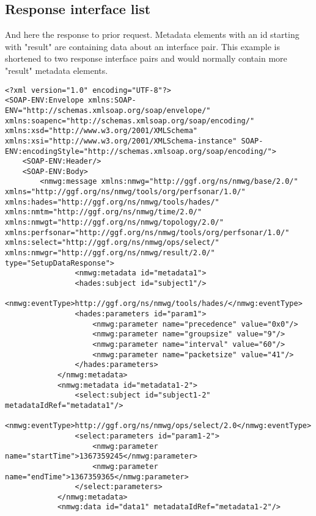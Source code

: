 \documentclass[a4paper,12pt,titlepage,hidelinks,fleqn]{article}
\begin{document}
\subsection{Response interface list}
\begin{flushleft}
And here the response to prior request. 
Metadata elements with an id starting with "result" are containing data about an interface pair. This example is shortened to two response interface pairs and would normally contain more "result" metadata elements.
\begin{framed}
\begin{lstlisting}
<?xml version="1.0" encoding="UTF-8"?>
<SOAP-ENV:Envelope xmlns:SOAP-ENV="http://schemas.xmlsoap.org/soap/envelope/" xmlns:soapenc="http://schemas.xmlsoap.org/soap/encoding/" xmlns:xsd="http://www.w3.org/2001/XMLSchema" xmlns:xsi="http://www.w3.org/2001/XMLSchema-instance" SOAP-ENV:encodingStyle="http://schemas.xmlsoap.org/soap/encoding/">
	<SOAP-ENV:Header/>
	<SOAP-ENV:Body>
		<nmwg:message xmlns:nmwg="http://ggf.org/ns/nmwg/base/2.0/" xmlns="http://ggf.org/ns/nmwg/tools/org/perfsonar/1.0/" xmlns:hades="http://ggf.org/ns/nmwg/tools/hades/" xmlns:nmtm="http://ggf.org/ns/nmwg/time/2.0/" xmlns:nmwgt="http://ggf.org/ns/nmwg/topology/2.0/" xmlns:perfsonar="http://ggf.org/ns/nmwg/tools/org/perfsonar/1.0/" xmlns:select="http://ggf.org/ns/nmwg/ops/select/" xmlns:nmwgr="http://ggf.org/ns/nmwg/result/2.0/" type="SetupDataResponse">
				<nmwg:metadata id="metadata1">
				<hades:subject id="subject1"/>
				<nmwg:eventType>http://ggf.org/ns/nmwg/tools/hades/</nmwg:eventType>
				<hades:parameters id="param1">
					<nmwg:parameter name="precedence" value="0x0"/>
					<nmwg:parameter name="groupsize" value="9"/>
					<nmwg:parameter name="interval" value="60"/>
					<nmwg:parameter name="packetsize" value="41"/>
				</hades:parameters>
			</nmwg:metadata>
			<nmwg:metadata id="metadata1-2">
				<select:subject id="subject1-2" metadataIdRef="metadata1"/>
				<nmwg:eventType>http://ggf.org/ns/nmwg/ops/select/2.0</nmwg:eventType>
				<select:parameters id="param1-2">
					<nmwg:parameter name="startTime">1367359245</nmwg:parameter>
					<nmwg:parameter name="endTime">1367359365</nmwg:parameter>
				</select:parameters>
			</nmwg:metadata>
			<nmwg:data id="data1" metadataIdRef="metadata1-2"/>			
			

\end{lstlisting}
\end{framed}
\end{flushleft}
\end{document}
